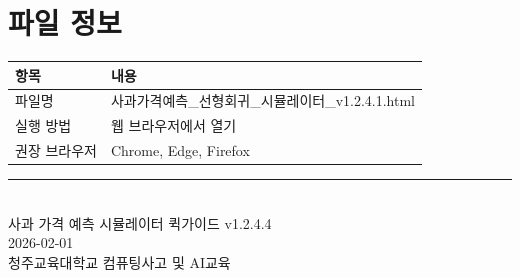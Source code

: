 \documentclass[11pt, a4paper]{article}
\begin{document}
\section{파일 정보}

\begin{center}
\begin{tabular}{lp{10cm}}
    \toprule
    \textbf{항목} & \textbf{내용} \\
    \midrule
    파일명 & 사과가격예측\_선형회귀\_시뮬레이터\_v1.2.4.1.html \\
    실행 방법 & 웹 브라우저에서 열기 \\
    권장 브라우저 & Chrome, Edge, Firefox \\
    \bottomrule
\end{tabular}
\end{center}

\vfill
\begin{center}
\rule{0.8\textwidth}{0.5pt}\\[0.3cm]
{\small\color{textmedium}
사과 가격 예측 시뮬레이터 퀵가이드 v1.2.4.4\\
2026-02-01\\
청주교육대학교 컴퓨팅사고 및 AI교육
}
\end{center}
\end{document}
